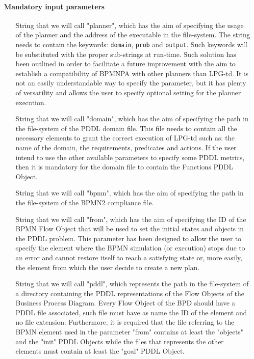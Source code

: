 \paragraph{Mandatory input parameters}
\begin{itemize}

   \item[String] that we will call "planner", which has the aim of specifying the usage of the planner and the address of the executable in the file-system. The string needs to contain the keywords: \texttt{domain}, \texttt{prob} and \texttt{output}. Such keywords will be substituted with the proper sub-strings at run-time. 
   Such solution has been outlined in order to facilitate a future  improvement with the aim to establish a compatibility of BPMNPA with other planners than LPG-td. 
   It is not an easily understandable way to specify the parameter, but it has plenty of versatility and allows the user to specify optional setting for the planner execution. 
   
 	\item[String] that we will call "domain", which has the aim of specifying the path in the file-system of the PDDL domain file. This file needs to contain all the necessary elements to grant the correct execution of LPG-td such as: the name of the domain, the requirements, predicates and actions. If the user intend to use the other available parameters to specify some PDDL metrics, then it is mandatory for the domain file to contain the Functions PDDL Object.
	
	\item[String] that we will call "bpmn", which has the aim of specifying the path in the file-system of the BPMN2 compliance file. 


	\item[String] that we will call "from", which has the aim of specifying the ID of the BPMN Flow Object that will be used to set the initial states and objects in the PDDL problem. This parameter has been designed to allow the user to specify the element where the BPMN simulation (or execution) stops due to an error and cannot restore itself to reach a satisfying state or, more easily, the element from which the user decide to create a new plan. 


	\item[String] that we will call "pddl", which represents the path in the file-system of a directory containing the PDDL representations of the Flow Objects of the Business Process Diagram. 
	Every Flow Object of the BPD should have a PDDL file associated, such file must have as name the ID of the element and no file extension. 
	Furthermore, it is required that the file referring to the BPMN element used in the parameter "from" contains at least the "objects" and the "init" PDDL Objects while the files that represents the other elements must contain at least the "goal" PDDL Object.
	
\end{itemize}

